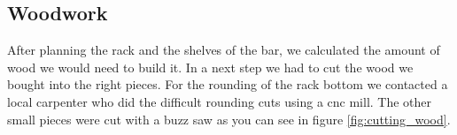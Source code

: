 \documentclass{acm_proc_article-sp}
\begin{document}
\subsection{Woodwork}

\begin{minipage}{\linewidth}%
\label{fig:cutting_wood}%
\end{minipage}


After planning the rack and the shelves of the bar, we calculated the amount of wood we would need to build it. In a next step we had to cut the wood we bought into the right pieces. For the rounding of the rack bottom we contacted a local carpenter who did the difficult rounding cuts using a cnc mill. The other small pieces were cut with a buzz saw as you can see in figure \ref{fig:cutting_wood}.

\begin{minipage}{\linewidth}%
\label{fig:assembling}%
\end{minipage}
\end{document}
